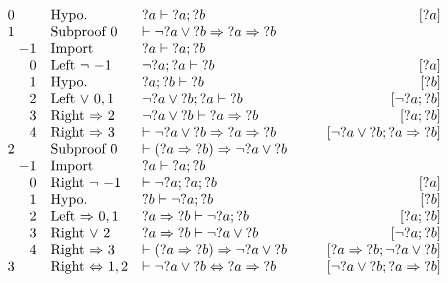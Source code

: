 \small
$\begin{array}{r@{\hskip 0.1cm}rll@{\hskip 1cm}r}
0   &  & \text{Hypo.}~                       & {?a} \vdash {?a}; {?b}                                          & [{?a}] \\
1   &  & \text{Subproof}~0                   & \vdash \neg{?a} \lor {?b} \Rightarrow {?a} \Rightarrow {?b}     & \\
 &  -1 & \text{Import}~                      & {?a} \vdash {?a}; {?b}                                          & \\
 &   0 & \text{Left}~{\neg}~{-1}             & \neg{?a}; {?a} \vdash {?b}                                      & [{?a}] \\
 &   1 & \text{Hypo.}~                       & {?a}; {?b} \vdash {?b}                                          & [{?b}] \\
 &   2 & \text{Left}~{\lor}~0, 1             & \neg{?a} \lor {?b}; {?a} \vdash {?b}                            & [\neg{?a}; {?b}] \\
 &   3 & \text{Right}~{\Rightarrow}~2        & \neg{?a} \lor {?b} \vdash {?a} \Rightarrow {?b}                 & [{?a}; {?b}] \\
 &   4 & \text{Right}~{\Rightarrow}~3        & \vdash \neg{?a} \lor {?b} \Rightarrow {?a} \Rightarrow {?b}     & [\neg{?a} \lor {?b}; {?a} \Rightarrow {?b}] \\
2   &  & \text{Subproof}~0                   & \vdash ({?a} \Rightarrow {?b}) \Rightarrow \neg{?a} \lor {?b}   & \\
 &  -1 & \text{Import}~                      & {?a} \vdash {?a}; {?b}                                          & \\
 &   0 & \text{Right}~{\neg}~{-1}            & \vdash \neg{?a}; {?a}; {?b}                                     & [{?a}] \\
 &   1 & \text{Hypo.}~                       & {?b} \vdash \neg{?a}; {?b}                                      & [{?b}] \\
 &   2 & \text{Left}~{\Rightarrow}~0, 1      & {?a} \Rightarrow {?b} \vdash \neg{?a}; {?b}                     & [{?a}; {?b}] \\
 &   3 & \text{Right}~{\lor}~2               & {?a} \Rightarrow {?b} \vdash \neg{?a} \lor {?b}                 & [\neg{?a}; {?b}] \\
 &   4 & \text{Right}~{\Rightarrow}~3        & \vdash ({?a} \Rightarrow {?b}) \Rightarrow \neg{?a} \lor {?b}   & [{?a} \Rightarrow {?b}; \neg{?a} \lor {?b}] \\
3   &  & \text{Right}~{\Leftrightarrow}~1, 2 & \vdash \neg{?a} \lor {?b} \Leftrightarrow {?a} \Rightarrow {?b} & [\neg{?a} \lor {?b}; {?a} \Rightarrow {?b}]
\end{array}$
\normalsize
